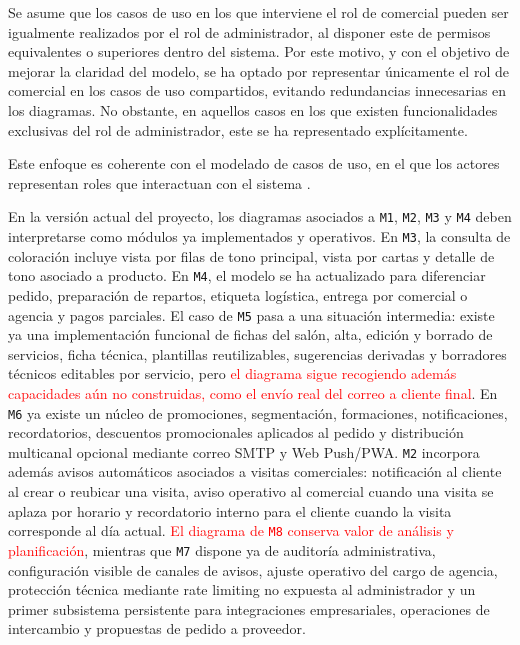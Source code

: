 Se asume que los casos de uso en los que interviene el rol de comercial pueden ser igualmente realizados por el rol de administrador, al disponer este de permisos equivalentes o superiores dentro del sistema. Por este motivo, y con el objetivo de mejorar la claridad del modelo, se ha optado por representar únicamente el rol de comercial en los casos de uso compartidos, evitando redundancias innecesarias en los diagramas. No obstante, en aquellos casos en los que existen funcionalidades exclusivas del rol de administrador, este se ha representado explícitamente.

Este enfoque es coherente con el modelado de casos de uso, en el que los actores representan roles que interactuan con el sistema \citep[Ch.~4]{sommerville}.

\bigskip

En la versión actual del proyecto, los diagramas asociados a \texttt{M1}, \texttt{M2}, \texttt{M3} y \texttt{M4} deben interpretarse como módulos ya implementados y operativos. En \texttt{M3}, la consulta de coloración incluye vista por filas de tono principal, vista por cartas y detalle de tono asociado a producto. En \texttt{M4}, el modelo se ha actualizado para diferenciar pedido, preparación de repartos, etiqueta logística, entrega por comercial o agencia y pagos parciales. El caso de \texttt{M5} pasa a una situación intermedia: existe ya una implementación funcional de fichas del salón, alta, edición y borrado de servicios, ficha técnica, plantillas reutilizables, sugerencias derivadas y borradores técnicos editables por servicio, pero \textcolor{red}{el diagrama sigue recogiendo además capacidades aún no construidas, como el envío real del correo a cliente final}. En \texttt{M6} ya existe un núcleo de promociones, segmentación, formaciones, notificaciones, recordatorios, descuentos promocionales aplicados al pedido y distribución multicanal opcional mediante correo SMTP y Web Push/PWA. \texttt{M2} incorpora además avisos automáticos asociados a visitas comerciales: notificación al cliente al crear o reubicar una visita, aviso operativo al comercial cuando una visita se aplaza por horario y recordatorio interno para el cliente cuando la visita corresponde al día actual. \textcolor{red}{El diagrama de \texttt{M8} conserva valor de análisis y planificación}, mientras que \texttt{M7} dispone ya de auditoría administrativa, configuración visible de canales de avisos, ajuste operativo del cargo de agencia, protección técnica mediante rate limiting no expuesta al administrador y un primer subsistema persistente para integraciones empresariales, operaciones de intercambio y propuestas de pedido a proveedor.

